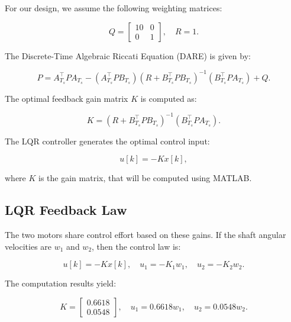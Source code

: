 For our design, we assume the following weighting matrices:

\[
Q = \begin{bmatrix}
10 & 0 \\
0 & 1
\end{bmatrix}, \quad R = 1.
\]

The Discrete-Time Algebraic Riccati Equation (DARE) is given by:

\[
P = A_{T_s}^\top P A_{T_s} - \left(A_{T_s}^\top P B_{T_s} \right) 
\left(R + B_{T_s}^\top P B_{T_s} \right)^{-1} 
\left(B_{T_s}^\top P A_{T_s} \right) + Q.
\]

The optimal feedback gain matrix \( K \) is computed as:

\[
K = \left( R + B_{T_s}^\top P B_{T_s} \right)^{-1} \left(B_{T_s}^\top P A_{T_s} \right).
\]

The LQR controller generates the optimal control input:

\[
u[k] = -K x[k],
\]

where \( K \) is the gain matrix, that will be computed using MATLAB.

\subsection*{LQR Feedback Law}
The two motors share control effort based on these gains. If the shaft angular velocities are \( w_{1} \) and \( w_{2} \), then the control law is:

\[
u[k] = -K x[k], \quad u_{1} = -K_{1} w_{1}, \quad u_{2} = -K_{2} w_{2}.
\]

The computation results yield:

\[
K = \begin{bmatrix}
0.6618 \\ 0.0548
\end{bmatrix}, \quad u_{1} = 0.6618 w_{1}, \quad u_{2} = 0.0548 w_{2}.
\]
